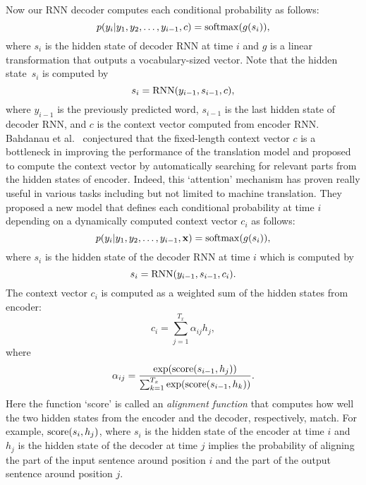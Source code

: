 \documentclass[10pt,twocolumn,letterpaper]{article}
\begin{document}
Now our RNN decoder computes each conditional probability as follows:
\[
p(y_i | y_1, y_2, \ldots, y_{i-1}, c) = {\rm softmax}(g(s_{i})),
\]
where $s_i$ is the hidden state of decoder RNN at time $i$ and $g$ is a linear transformation
that outputs a vocabulary-sized vector.
Note that the hidden state~$s_i$ is computed by
\[
s_i = {\rm RNN}(y_{i-1},s_{i-1}, c),
\]
where $y_{i-1}$ is the previously predicted word, $s_{i-1}$ is the last hidden state of decoder RNN, and $c$ is the context vector computed from encoder RNN.\\

 Bahdanau et al.~\cite{BahdanauCB14} conjectured that the fixed-length context vector $c$ is a bottleneck in improving the performance of the translation model and proposed to compute the context vector by automatically searching for relevant parts from the hidden states of encoder. Indeed, this `attention' mechanism has proven really useful in various tasks including but not limited to machine translation. They proposed a new model that defines each conditional probability at time $i$ depending on a dynamically computed context vector $c_i$ as follows:
\[
p(y_i | y_1, y_2, \ldots, y_{i-1}, {\bf x}) = {\rm softmax}(g(s_i)),
\]
where $s_i$ is the hidden state of the decoder RNN at time $i$ which is computed by
\[
s_i = {\rm RNN}(y_{i-1}, s_{i-1}, c_i).
\]
The context vector $c_i$ is computed as a weighted sum of the hidden states from encoder:
\[
c_i = \sum_{j=1}^{T_x} \alpha_{ij} h_j,
\]
where
\[
\alpha_{ij} = \frac{\exp ({\rm score}(s_{i-1}, h_j))}{\sum_{k=1}^{T_x} \exp({\rm score}(s_{i-1}, h_k))}.
\]
Here the function `score' is called an {\em alignment function} that computes how well the two hidden states from the encoder and the decoder, respectively, match. For example, ${\rm score}(s_i, h_j)$, where $s_i$ is the hidden state of the encoder at time $i$ and $h_j$ is the hidden state of the decoder at time $j$ implies the probability of aligning the part of the input sentence around position $i$ and the part of the output sentence around position $j$.
\\
\end{document}
